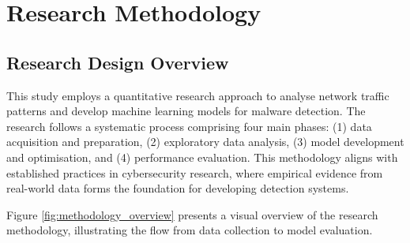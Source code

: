 \chapter{Research Methodology}

\section{Research Design Overview}

This study employs a quantitative research approach to analyse network traffic patterns and develop machine learning models for malware detection. The research follows a systematic process comprising four main phases: (1) data acquisition and preparation, (2) exploratory data analysis, (3) model development and optimisation, and (4) performance evaluation. This methodology aligns with established practices in cybersecurity research, where empirical evidence from real-world data forms the foundation for developing detection systems.

Figure \ref{fig:methodology_overview} presents a visual overview of the research methodology, illustrating the flow from data collection to model evaluation.

